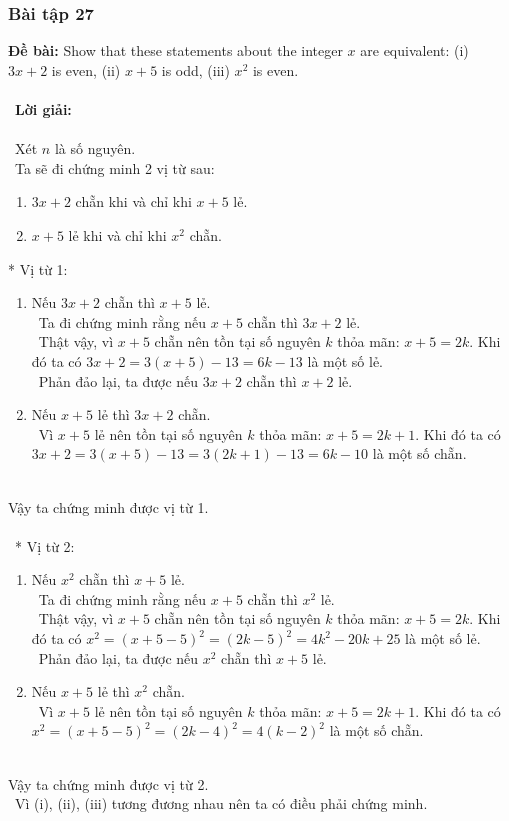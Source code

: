 \documentclass[a4paper]{article}
\begin{document}
\clearpage
\subsubsection{Bài tập 27}
\textbf{Đề bài: }Show that these statements about the integer $x$ are equivalent: (i) $3x + 2$ is even, (ii) $x + 5$ is odd,
(iii) $x^2$ is even.\\ \\\
\textbf{Lời giải:} \\\ \\\
Xét $n$ là số nguyên. \\\
Ta sẽ đi chứng minh 2 vị từ sau:
\begin{enumerate}
\item $3x + 2$ chẵn khi và chỉ khi $x + 5$ lẻ.
\item $x+5$ lẻ khi và chỉ khi $x^2$ chẵn.
\end{enumerate}
* Vị từ 1:
\begin{enumerate}
\item Nếu $3x+2$ chẵn thì $x+5$ lẻ. \\\
Ta đi chứng minh rằng nếu $x+5$ chẵn thì $3x+2$ lẻ. \\\
Thật vậy, vì $x+5$ chẵn nên tồn tại số nguyên $k$ thỏa mãn: $x+5 = 2k$. Khi đó ta có $3x+2=3(x+5)-13=6k-13$ là một số lẻ.  \\\
Phản đảo lại, ta được nếu $3x+2$ chẵn thì $x+2$ lẻ.
\item Nếu $x+5$ lẻ thì $3x+2$ chẵn. \\\
Vì $x+5$ lẻ nên tồn tại số nguyên $k$ thỏa mãn: $x+5 = 2k+1$. Khi đó ta có $3x+2=3(x+5)-13=3(2k+1)-13 = 6k-10$ là một số chẵn.  \\\
\end{enumerate}
Vậy ta chứng minh được vị từ 1. \\\ \\\
* Vị từ 2:
\begin{enumerate}
\item Nếu $x^2$ chẵn thì $x+5$ lẻ. \\\
Ta đi chứng minh rằng nếu $x+5$ chẵn thì $x^2$ lẻ. \\\
Thật vậy, vì $x+5$ chẵn nên tồn tại số nguyên $k$ thỏa mãn: $x+5 = 2k$. Khi đó ta có $x^2 = (x+5-5)^2=(2k-5)^2 = 4k^2-20k+25$ là một số lẻ.  \\\
Phản đảo lại, ta được nếu $x^2$ chẵn thì $x+5$ lẻ.
\item Nếu $x+5$ lẻ thì $x^2$ chẵn. \\\
Vì $x+5$ lẻ nên tồn tại số nguyên $k$ thỏa mãn: $x+5 = 2k+1$. Khi đó ta có $x^2 = (x+5-5)^2=(2k-4)^2=4(k-2)^2$ là một số chẵn.  \\\
\end{enumerate}
Vậy ta chứng minh được vị từ 2. \\\
Vì (i), (ii), (iii) tương đương nhau nên ta có điều phải chứng minh.
\clearpage
\end{document}
